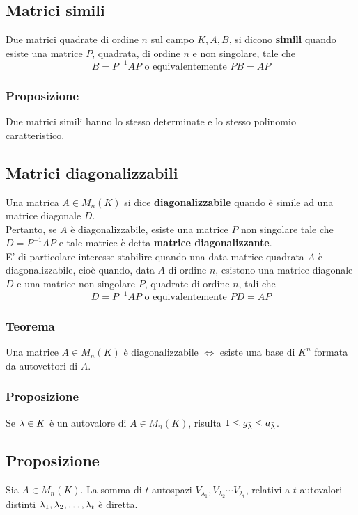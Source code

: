 \documentclass[../main.tex]{subfiles}
\begin{document}
\subsection{Matrici simili}
Due matrici quadrate di ordine $n$ sul campo $K, A, B$, si dicono
\textbf{simili} quando esiste una matrice $P$, quadrata, di ordine $n$ e non
singolare, tale che
\[
    B = P^{-1}AP \text{ o equivalentemente } PB = AP\]
\subsubsection{Proposizione}
Due matrici simili hanno lo stesso determinate e lo stesso polinomio
caratteristico.

\subsection{Matrici diagonalizzabili}
Una matrica $A\in M_n(K)$ si dice \textbf{diagonalizzabile} quando è simile ad
una matrice diagonale $D$.\\ Pertanto, se $A$ è diagonalizzabile, esiste una
matrice $P$ non singolare tale che $D = P^{-1}AP$ e tale matrice è detta
\textbf{matrice diagonalizzante}.\\ E' di particolare interesse stabilire
quando una data matrice quadrata $A$ è diagonalizzabile, cioè quando, data $A$
di ordine $n$, esistono una matrice diagonale $D$ e una matrice non singolare
$P$, quadrate di ordine $n$, tali che
\[
    D = P^{-1}AP \text{ o equivalentemente } PD=AP\]

\subsubsection{Teorema}
Una matrice $A\in M_n(K)$ è diagonalizzabile $\iff$ esiste una base di $K^n$
formata da autovettori di $A$.

\subsubsection{Proposizione}
Se $\Bar{\lambda}\in K$ è un autovalore di $A\in M_n(K)$, risulta $1\leq
    g_{\Bar{\lambda}}\leq a_{\Bar{\lambda}}$.

\subsection{Proposizione}
Sia $A\in M_n(K)$. La somma di $t$ autospazi $V_{\lambda_1},
    V_{\lambda_2}\cdots V_{\lambda_t}$, relativi a $t$ autovalori distinti
$\lambda_1, \lambda_2, \ldots, \lambda_{t}$ è diretta.
\end{document}
